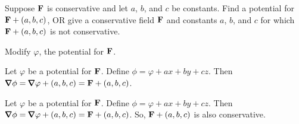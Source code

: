 \begin{question}
Suppose $\mathbf{F}$ is conservative and let $a$, $b$, and $c$ be constants. Find a potential for $\mathbf{F}+(a,b,c)$, OR give a conservative field $\mathbf{F}$ and constants  $a$, $b$, and $c$ for which $\mathbf{F}+(a,b,c)$ is not conservative.

\end{question}
\begin{hint}
Modify $\varphi$, the potential for $\mathbf{F}$.
\end{hint}
\begin{answer}
Let $\varphi$ be a potential for $\mathbf{F}$. Define $\phi=\varphi+ax+by+cz$. Then $\vnabla \phi = \vnabla\varphi+(a,b,c)=\vF+(a,b,c)$.
\end{answer}
\begin{solution}
Let $\varphi$ be a potential for $\mathbf{F}$. Define $\phi=\varphi+ax+by+cz$. Then $\vnabla \phi = \vnabla\varphi+(a,b,c)=\vF+(a,b,c)$. So, $\mathbf{F}+(a,b,c)$ is also conservative.
\end{solution}

